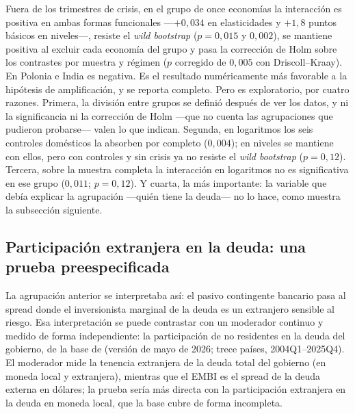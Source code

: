 Fuera de los trimestres de crisis, en el grupo de once economías la interacción es positiva en ambas formas funcionales ---$+0{,}034$ en elasticidades y $+1{,}8$ puntos básicos en niveles---, resiste el \textit{wild bootstrap} ($p=0{,}015$ y $0{,}002$), se mantiene positiva al excluir cada economía del grupo y pasa la corrección de Holm sobre los contrastes por muestra y régimen ($p$ corregido de $0{,}005$ con Driscoll--Kraay). En Polonia e India es negativa. Es el resultado numéricamente más favorable a la hipótesis de amplificación, y se reporta completo. Pero es exploratorio, por cuatro razones. Primera, la división entre grupos se definió después de ver los datos, y ni la significancia ni la corrección de Holm ---que no cuenta las agrupaciones que pudieron probarse--- valen lo que indican. Segunda, en logaritmos los seis controles domésticos la absorben por completo ($0{,}004$); en niveles se mantiene con ellos, pero con controles y sin crisis ya no resiste el \textit{wild bootstrap} ($p=0{,}12$). Tercera, sobre la muestra completa la interacción en logaritmos no es significativa en ese grupo ($0{,}011$; $p=0{,}12$). Y cuarta, la más importante: la variable que debía explicar la agrupación ---quién tiene la deuda--- no lo hace, como muestra la subsección siguiente.

\subsection{Participación extranjera en la deuda: una prueba preespecificada}
\label{sec:participacion-extranjera}

La agrupación anterior se interpretaba así: el pasivo contingente bancario pasa al spread donde el inversionista marginal de la deuda es un extranjero sensible al riesgo. Esa interpretación se puede contrastar con un moderador continuo y medido de forma independiente: la participación de no residentes en la deuda del gobierno, de la base de \citet{ArslanalpTsuda2014} (versión de mayo de 2026; trece países, 2004Q1--2025Q4). El moderador mide la tenencia extranjera de la deuda total del gobierno (en moneda local y extranjera), mientras que el EMBI es el spread de la deuda externa en dólares; la prueba sería más directa con la participación extranjera en la deuda en moneda local, que la base cubre de forma incompleta.

